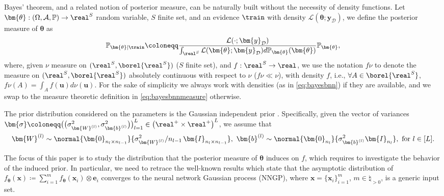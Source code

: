 \begin{remark}
    Bayes' theorem, and a related notion of posterior measure, can be naturally built without the necessity of density functions.
    Let $\bm{\theta}: (\Omega, \mathcal{A}, \mathbb{P}) \to \real^S$ random variable, $S$ finite set, and an evidence $\train$ with density $\mathcal{L}(\bm{\theta}; \bm{y}_{\mathcal{D}})$, we define the posterior measure of $\bm{\theta}$ as
    \begin{equation} \label{eq:bayesbnnmeasure}
        \mathbb{P}_{\bm{\theta} | \train} \coloneqq \frac{\mathcal{L}(\cdot; \bm{y}_{\mathcal{D}})}{\int_{\real^S} \mathcal{L}(\bm{\theta}; \bm{y}_{\mathcal{D}}) d\mathbb{P}_{\bm{\theta}}(\bm{\theta})} \mathbb{P}_{\bm{\theta}},
    \end{equation}
    where, given $\nu$ measure on $(\real^S, \borel{\real^S})$ ($S$ finite set), and $f: \real^S \to \real$, we use the notation $f \nu$ to denote the measure on $(\real^S, \borel{\real^S})$ absolutely continuous with respect to $\nu$ ($f \nu \ll \nu$), with density $f$, i.e., $\forall A \in \borel{\real^S}$, $f \nu (A) = \int_{A} f(\bm{u}) d\nu(\bm{u})$. For the sake of simplicity we always work with densities (as in \cref{eq:bayesbnn}) if they are available, and we swap to the measure theoretic definition in \cref{eq:bayesbnnmeasure} otherwise.
\end{remark}

The prior distribution considered on the parameters is the Gaussian independent prior \citep{neal1996}. Specifically, given the vector of variances $\bm{\sigma} \coloneqq \smash{\big(\big(\sigma_{\bm{W}^{(l)}}^2, \sigma_{\bm{b}^{(l)}}^2\big)\big)_{l = 1}^{L}} \in \left(\real^+ \times \real^+\right)^L$, we assume that
\begin{equation} \label{eq:nealprior}
    \begin{gathered}
        \bm{W}^{(l)} \sim \normal{\bm{0}_{n_l \times n_{l - 1}}}{\sigma_{\bm{W}^{(l)}}^2 / n_{l - 1} \, \bm{I}_{n_l \times n_{l - 1}}}, \ 
        \bm{b}^{(l)} \sim \normal{\bm{0}_{n_l}}{\sigma_{\bm{b}^{(l)}}^2 \bm{I}_{n_l}}, \text{ for } l \in [L].
    \end{gathered}
\end{equation}

The focus of this paper is to study the distribution that the posterior measure of $\bm{\theta}$ induces on $f$, which requires to investigate the behavior of the induced prior. In particular, we need to retrace the well-known results which state that the asymptotic distribution of $f_{\bm{\theta}}(\bm{x}) \coloneqq \sum_{i = 1}^m f_{\bm{\theta}}(\bm{x}_i) \otimes \bm{e}_i$ converges to the neural network Gaussian process (NNGP), where $\bm{x} = \{\bm{x}_i\}_{i = 1}^m$, $m \in \natural_{> 0}$, is a generic input set.

